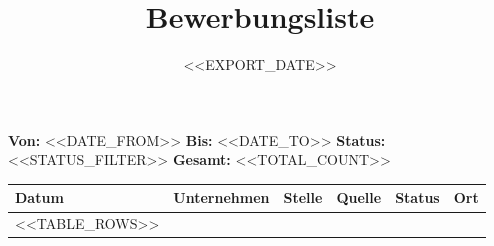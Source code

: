 \documentclass[a4paper,11pt]{scrartcl}
\title{Bewerbungsliste}
\date{<<EXPORT_DATE>>}
\begin{document}
\maketitle

\noindent
\textbf{Von:} <<DATE_FROM>>\quad
\textbf{Bis:} <<DATE_TO>>\quad
\textbf{Status:} <<STATUS_FILTER>>\quad
\textbf{Gesamt:} <<TOTAL_COUNT>>

\vspace{1em}

\begin{longtable}{|l|p{4cm}|p{4.5cm}|l|l|l|}
\hline
\textbf{Datum} & \textbf{Unternehmen} & \textbf{Stelle} & \textbf{Quelle} & \textbf{Status} & \textbf{Ort} \\
\hline
\endhead
<<TABLE_ROWS>>
\hline
\end{longtable}
\end{document}
